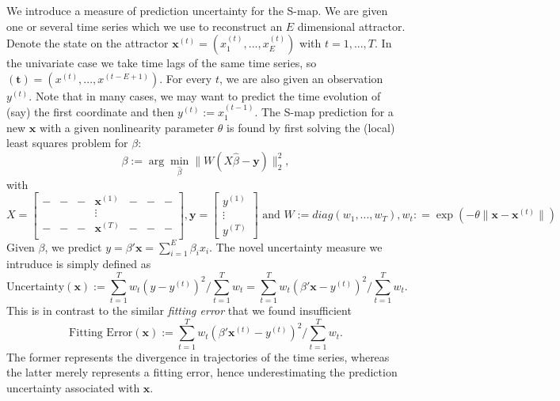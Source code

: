 \documentclass[fleqn,10pt]{wlscirep}
\begin{document}
We introduce a measure of prediction uncertainty for the S-map. We are
given one or several time series which we use to reconstruct an $E$
dimensional attractor. Denote the state on the attractor
$\mathbf{x}^{(t)} = (x_1^{(t)},...,x_E^{(t)})$ with $t=1,...,T$. In
the univariate case we take time lags of the same time series, so
$\mathbf{(t)} = (x^{(t)},...,x^{(t-E+1)})$. For every $t$, we are also
given an observation $y^{(t)}$. Note that in many cases, we may want
to predict the time evolution of (say) the first coordinate and then
$y^{(t)} := x_1^{(t-1)}$. The S-map prediction for a new $\mathbf{x}$
with a given nonlinearity parameter $\theta$ is found by first solving
the (local) least squares problem for $\beta$:
\begin{equation}
  \beta := \arg \min_{\hat{\beta}} \|W(X \hat{\beta} - \mathbf{y}) \|_2^2,
\end{equation}
with
\begin{equation*}
  X =
  \begin{bmatrix}
    -& -& -& \mathbf{x}^{(1)} & - & - & - \\
     &  &  &  \vdots         &   &   &   \\
    -& -& -& \mathbf{x}^{(T)} & - & - & - \\    
  \end{bmatrix},
  \mathbf{y} =
  \begin{bmatrix}
    y^{(1)} \\
    \vdots \\
    y^{(T)}
  \end{bmatrix}
  \text{ and } W := diag( w_1,...,w_T), w_t: =\exp( -\theta \| \mathbf{x} - \mathbf{x}^{(t)}\| )
\end{equation*}
Given $\beta$, we predict $y = \beta' \mathbf{x} = \sum_{i=1}^E
\beta_i x_i$. The novel uncertainty measure we intruduce is simply
defined as
\begin{equation}\label{eq:uncertainty}
  \text{Uncertainty}(\mathbf{x}) := \sum_{t=1}^T w_t (y - y^{(t)})^2
  \bigg / \sum_{t=1}^T w_t = \sum_{t=1}^T w_t (\beta' \mathbf{x} -
  y^{(t)})^2 \bigg / \sum_{t=1}^T w_t.
\end{equation}
This is in contrast to the similar \emph{fitting error} that we found
insufficient
\begin{equation*}
\text{Fitting Error}(\mathbf{x}) := \sum_{t=1}^T w_t ( \beta'
\mathbf{x}^{(t)} - y^{(t)})^2 \bigg / \sum_{t=1}^T w_t.
\end{equation*}
The former represents the divergence in trajectories of the time
series, whereas the latter merely represents a fitting error, hence
underestimating the prediction uncertainty associated with
$\mathbf{x}$.
\end{document}
